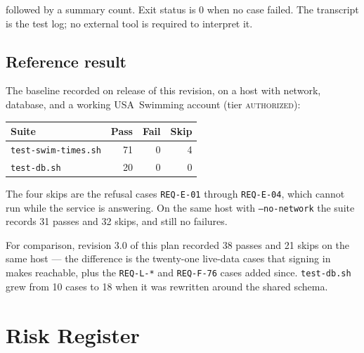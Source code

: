 \documentclass[12pt]{article}
\newcommand{\code}[1]{\texttt{#1}}
\newcommand{\req}[1]{\texttt{#1}}
\begin{document}
\noindent followed by a summary count.  Exit status is 0 when no case
failed.  The transcript is the test log; no external tool is required
to interpret it.

\subsection{Reference result}

The baseline recorded on release of this revision, on a host with
network, database, and a working USA~Swimming account (tier
\textsc{authorized}):

\begin{center}
\begin{tabular}{lrrr}
  \toprule
  \textbf{Suite} & \textbf{Pass} & \textbf{Fail} & \textbf{Skip} \\
  \midrule
  \code{test-swim-times.sh} & 71 & 0 & 4 \\
  \code{test-db.sh}         & 20 & 0 & 0 \\
  \bottomrule
\end{tabular}
\end{center}

\noindent The four skips are the refusal cases \req{REQ-E-01} through
\req{REQ-E-04}, which cannot run while the service is answering.  On
the same host with \code{--no-network} the suite records 31 passes and
32 skips, and still no failures.

For comparison, revision 3.0 of this plan recorded 38 passes and 21
skips on the same host --- the difference is the twenty-one live-data
cases that signing in makes reachable, plus the \req{REQ-L-*} and
\req{REQ-F-76} cases added since.  \code{test-db.sh} grew from 10 cases
to 18 when it was rewritten around the shared schema.

\section{Risk Register}
\end{document}
